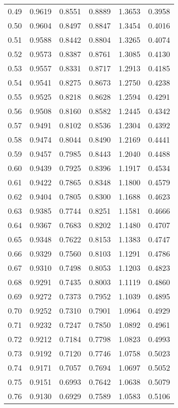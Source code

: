 \documentclass{article}
\begin{document}
\begin{longtable}{cccccc}
0.49 & 0.9619 & 0.8551 & 0.8889 & 1.3653 & 0.3958 \\
0.50 & 0.9604 & 0.8497 & 0.8847 & 1.3454 & 0.4016 \\
0.51 & 0.9588 & 0.8442 & 0.8804 & 1.3265 & 0.4074 \\
0.52 & 0.9573 & 0.8387 & 0.8761 & 1.3085 & 0.4130 \\
0.53 & 0.9557 & 0.8331 & 0.8717 & 1.2913 & 0.4185 \\
0.54 & 0.9541 & 0.8275 & 0.8673 & 1.2750 & 0.4238 \\
0.55 & 0.9525 & 0.8218 & 0.8628 & 1.2594 & 0.4291 \\
0.56 & 0.9508 & 0.8160 & 0.8582 & 1.2445 & 0.4342 \\
0.57 & 0.9491 & 0.8102 & 0.8536 & 1.2304 & 0.4392 \\
0.58 & 0.9474 & 0.8044 & 0.8490 & 1.2169 & 0.4441 \\
0.59 & 0.9457 & 0.7985 & 0.8443 & 1.2040 & 0.4488 \\
0.60 & 0.9439 & 0.7925 & 0.8396 & 1.1917 & 0.4534 \\
0.61 & 0.9422 & 0.7865 & 0.8348 & 1.1800 & 0.4579 \\
0.62 & 0.9404 & 0.7805 & 0.8300 & 1.1688 & 0.4623 \\
0.63 & 0.9385 & 0.7744 & 0.8251 & 1.1581 & 0.4666 \\
0.64 & 0.9367 & 0.7683 & 0.8202 & 1.1480 & 0.4707 \\
0.65 & 0.9348 & 0.7622 & 0.8153 & 1.1383 & 0.4747 \\
0.66 & 0.9329 & 0.7560 & 0.8103 & 1.1291 & 0.4786 \\
0.67 & 0.9310 & 0.7498 & 0.8053 & 1.1203 & 0.4823 \\
0.68 & 0.9291 & 0.7435 & 0.8003 & 1.1119 & 0.4860 \\
0.69 & 0.9272 & 0.7373 & 0.7952 & 1.1039 & 0.4895 \\
0.70 & 0.9252 & 0.7310 & 0.7901 & 1.0964 & 0.4929 \\
0.71 & 0.9232 & 0.7247 & 0.7850 & 1.0892 & 0.4961 \\
0.72 & 0.9212 & 0.7184 & 0.7798 & 1.0823 & 0.4993 \\
0.73 & 0.9192 & 0.7120 & 0.7746 & 1.0758 & 0.5023 \\
0.74 & 0.9171 & 0.7057 & 0.7694 & 1.0697 & 0.5052 \\
0.75 & 0.9151 & 0.6993 & 0.7642 & 1.0638 & 0.5079 \\
0.76 & 0.9130 & 0.6929 & 0.7589 & 1.0583 & 0.5106 \\

\end{longtable}
\end{document}
